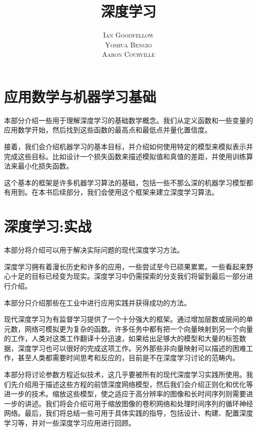 \documentclass[a4paper,11pt]{book}
\title{\Huge \textbf{深度学习} }
\author{\textsc{Ian Goodfellow} \\ \textsc{Yoshua Bengio} \\ \textsc{Aaron Courville}}
\numberwithin{equation}{chapter}
\begin{document}
\frontmatter
\maketitle

\tableofcontents
\listoffigures
\listoftables

\mainmatter





\part{应用数学与机器学习基础}
\label{part:1}

本部分介绍一些用于理解深度学习的基础数学概念。我们从定义函数和一些变量的应用数学开始，然后找到这些函数的最高点和最低点并量化置信度。


接着，我们会介绍机器学习的基本目标，并介绍如何使用特定的模型来模拟表示并完成这些目标。比如设计一个损失函数来描述模拟值和真值的差距，并使用训练算法来最小化损失函数。


这个基本的框架是许多机器学习算法的基础，包括一些不那么深的机器学习模型都有用到。在本书后续部分，我们会使用这个框架来建立深度学习算法。








\part{深度学习:实战}
\label{part:2}

本部分将介绍可以用于解决实际问题的现代深度学习方法。


深度学习拥有着漫长历史和许多的应用，一些尝试至今已硕果累累。一些看起来野心十足的目标已经变为现实。深度学习中仍需探索的分支我们将留到最后一部分进行介绍。


本部分只介绍那些在工业中进行应用实践并获得成功的方法。


现代深度学习为有监督学习提供了一个十分强大的框架。通过增加层数或层间的单元数，网络可模拟更为复杂的函数。许多任务中都有把一个向量映射到另一个向量的工作，人类对这类工作翻译十分迅速，如果给出足够大的模型和大量的标签数据，深度学习也可以很好的完成这项工作。另外那些非向量映射可以描述的困难工作，甚至人类都需要时间思考和反应的，目前是不在深度学习讨论的范畴内。


本部分将讨论参数方程近似技术，这几乎要被所有的现代深度学习实践所使用。我们先介绍用于描述这些方程的前馈深度网络模型，然后我们会介绍正则化和优化等进一步的技术。缩放这些模型，使之适应于高分辨率的图像和长时间序列则需要进一步的讲述。我们将会介绍可用于缩放图像的卷积网络和处理时间序列的循环神经网络。最后，我们将总结一些可用于具体实践的指导，包括设计、构建、配置深度学习等，并对一些深度学习应用进行回顾。
\end{document}
